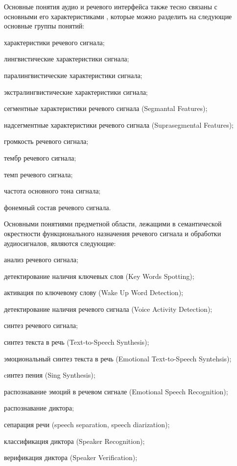 Основные понятия аудио и речевого интерфейса также тесно связаны с основными его характеристиками \textit{}, которые можно разделить на следующие основные группы понятий:
\begin{textitemize}
    \item характеристики речевого сигнала;
    \item лингвистические характеристики сигнала;
    \item паралингвистические характеристики сигнала;
    \item экстралингвистические характеристики сигнала;
    \item сегментные характеристики речевого сигнала (Segmantal Features);
    \item надсегментные характеристики речевого сигнала (Suprasegmental Features);
    \item громкость речевого сигнала;
    \item тембр речевого сигнала;
    \item темп речевого сигнала;
    \item частота основного тона сигнала;
    \item фонемный состав речевого сигнала.
\end{textitemize}


Основными понятиями предметной области, лежащими в семантической окрестности функционального назначения речевого сигнала и обработки аудиосигналов, являются следующие:
\begin{textitemize}    
    \item анализ речевого сигнала;
    \item детектирование наличия ключевых слов (Key Words Spotting);
    \item активация по ключевому слову (Wake Up Word Detection);
    \item детектирование наличия речевого сигнала (Voice Activity Detection);
    \item синтез речевого сигнала;
    \item синтез текста в речь (Text-to-Speech Synthesis);
    \item эмоциональный синтез текста в речь (Emotional Text-to-Speech Syntehsis);
    \item cинтез пения (Sing Synthesis);
    \item распознавание эмоций в речевом сигнале (Emotional Speech Recognition);
    \item распознавание диктора;
    \item сепарация речи (speech separation, speech diarization);
    \item классификация диктора (Speaker Recognition);
    \item верификация диктора (Speaker Verification);
\end{textitemize}

